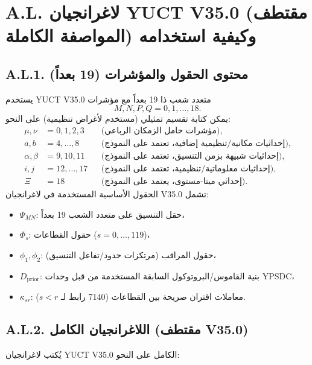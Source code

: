 \documentclass[13pt,a4paper]{article}
\newcommand{\Dprior}{D_{\mathrm{prior}}}
\begin{document}
	\section*{A.L. لاغرانجيان YUCT V35.0 (مقتطف المواصفة الكاملة) وكيفية استخدامه}
	
	\subsection*{A.L.1. محتوى الحقول والمؤشرات (19 بعداً)}
	يستخدم YUCT V35.0 متعدد شعب ذا 19 بعداً مع مؤشرات
	\[
	M,N,P,Q=0,1,\dots,18.
	\]
	يمكن كتابة تقسيم تمثيلي (مستخدم لأغراض تنظيمية) على النحو:
	\begin{align*}
		\mu,\nu &= 0,1,2,3 &&\text{(مؤشرات حامل الزمكان الرباعي)},\\
		a,b &= 4,\dots,8 &&\text{(إحداثيات مكانية/تنظيمية إضافية، تعتمد على النموذج)},\\
		\alpha,\beta &= 9,10,11 &&\text{(إحداثيات شبيهة بزمن التنسيق، تعتمد على النموذج)},\\
		i,j &= 12,\dots,17 &&\text{(إحداثيات معلوماتية/تنظيمية، تعتمد على النموذج)},\\
		\Xi &= 18 &&\text{(إحداثي ميتا-مستوى، يعتمد على النموذج)}.
	\end{align*}
	الحقول الأساسية المستخدمة في لاغرانجيان V35.0 تشمل:
	\begin{itemize}[leftmargin=*]
		\item $\Psi_{MN}$: حقل التنسيق على متعدد الشعب 19 بعداً،
		\item $\Phi_s$: حقول القطاعات ($s=0,\dots,119$)،
		\item $\phi_1,\phi_2$: حقول المراقب (مرتكزات حدود/تفاعل التنسيق)،
		\item $\Dprior$: بنية القاموس/البروتوكول السابقة المستخدمة من قبل وحدات YPSDC،
		\item $\kappa_{sr}$: معاملات اقتران صريحة بين القطاعات (7140 رابط لـ $s<r$).
	\end{itemize}
	
	\subsection*{A.L.2. اللاغرانجيان الكامل (مقتطف V35.0)}
	يُكتب لاغرانجيان YUCT V35.0 الكامل على النحو:
	
\end{document}
